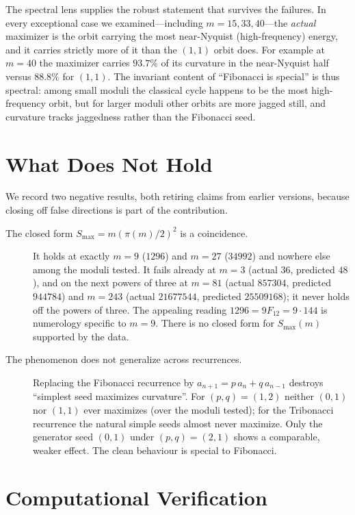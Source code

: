 \documentclass[12pt]{article}
\theoremstyle{remark}
\begin{document}
The spectral lens supplies the robust statement that survives the failures. In every
exceptional case we examined---including $m=15,33,40$---the \emph{actual} maximizer is the
orbit carrying the most near-Nyquist (high-frequency) energy, and it carries strictly more
of it than the $(1,1)$ orbit does. For example at $m=40$ the maximizer carries $93.7\%$ of
its curvature in the near-Nyquist half versus $88.8\%$ for $(1,1)$. The invariant content of
``Fibonacci is special'' is thus spectral: among small moduli the classical cycle happens
to be the most high-frequency orbit, but for larger moduli other orbits are more jagged
still, and curvature tracks jaggedness rather than the Fibonacci seed.

\section{What Does Not Hold}\label{sec:negatives}

We record two negative results, both retiring claims from earlier versions, because closing
off false directions is part of the contribution.

\begin{description}
\item[The closed form $S_{\max}=m(\pi(m)/2)^2$ is a coincidence.] It holds at exactly
$m=9$ ($1296$) and $m=27$ ($34992$) and nowhere else among the moduli tested. It fails
already at $m=3$ (actual $36$, predicted $48$), and on the next powers of three at $m=81$
(actual $857304$, predicted $944784$) and $m=243$ (actual $21677544$, predicted
$25509168$); it never holds off the powers of three. The appealing reading
$1296=9F_{12}=9\cdot 144$ is numerology specific to $m=9$. There is no closed form for
$S_{\max}(m)$ supported by the data.
\item[The phenomenon does not generalize across recurrences.] Replacing the Fibonacci
recurrence by $a_{n+1}=p\,a_n+q\,a_{n-1}$ destroys ``simplest seed maximizes curvature''.
For $(p,q)=(1,2)$ neither $(0,1)$ nor $(1,1)$ ever maximizes (over the moduli tested); for
the Tribonacci recurrence the natural simple seeds almost never maximize. Only the
generator seed $(0,1)$ under $(p,q)=(2,1)$ shows a comparable, weaker effect. The clean
behaviour is special to Fibonacci.
\end{description}

\section{Computational Verification}\label{sec:verify}
\end{document}
